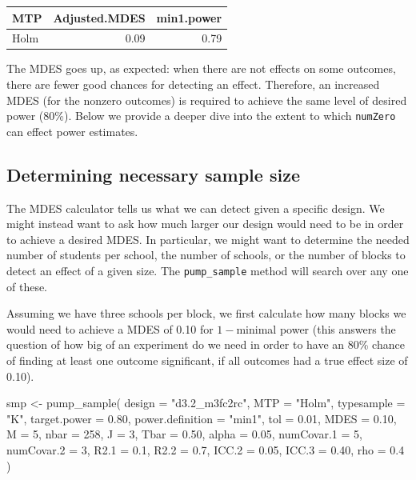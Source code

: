 \documentclass[
]{article}
\newenvironment{Shaded}{\begin{snugshade}}{\end{snugshade}}
\newcommand{\AttributeTok}[1]{\textcolor[rgb]{0.77,0.63,0.00}{#1}}
\newcommand{\DecValTok}[1]{\textcolor[rgb]{0.00,0.00,0.81}{#1}}
\newcommand{\FloatTok}[1]{\textcolor[rgb]{0.00,0.00,0.81}{#1}}
\newcommand{\FunctionTok}[1]{\textcolor[rgb]{0.00,0.00,0.00}{#1}}
\newcommand{\NormalTok}[1]{#1}
\newcommand{\OtherTok}[1]{\textcolor[rgb]{0.56,0.35,0.01}{#1}}
\newcommand{\StringTok}[1]{\textcolor[rgb]{0.31,0.60,0.02}{#1}}
\begin{document}
\begin{tabular}{l|r|r}
\hline
MTP & Adjusted.MDES & min1.power\\
\hline
Holm & 0.09 & 0.79\\
\hline
\end{tabular}

The MDES goes up, as expected: when there are not effects on some
outcomes, there are fewer good chances for detecting an effect.
Therefore, an increased MDES (for the nonzero outcomes) is required to
achieve the same level of desired power (80\%). Below we provide a
deeper dive into the extent to which \texttt{numZero} can effect power
estimates.

\subsection{Determining necessary sample size}

The MDES calculator tells us what we can detect given a specific design.
We might instead want to ask how much larger our design would need to be
in order to achieve a desired MDES. In particular, we might want to
determine the needed number of students per school, the number of
schools, or the number of blocks to detect an effect of a given size.
The \texttt{pump\_sample} method will search over any one of these.

Assuming we have three schools per block, we first calculate how many
blocks we would need to achieve a MDES of 0.10 for \(1-\)minimal power
(this answers the question of how big of an experiment do we need in
order to have an 80\% chance of finding at least one outcome
significant, if all outcomes had a true effect size of 0.10).

\begin{Shaded}
\begin{Highlighting}[]
\NormalTok{smp }\OtherTok{\textless{}{-}} \FunctionTok{pump\_sample}\NormalTok{(}
  \AttributeTok{design =} \StringTok{"d3.2\_m3fc2rc"}\NormalTok{,}
  \AttributeTok{MTP =} \StringTok{"Holm"}\NormalTok{,}
  \AttributeTok{typesample =} \StringTok{"K"}\NormalTok{,}
  \AttributeTok{target.power =} \FloatTok{0.80}\NormalTok{, }\AttributeTok{power.definition =} \StringTok{"min1"}\NormalTok{, }\AttributeTok{tol =} \FloatTok{0.01}\NormalTok{,}
  \AttributeTok{MDES =} \FloatTok{0.10}\NormalTok{, }\AttributeTok{M =} \DecValTok{5}\NormalTok{, }\AttributeTok{nbar =} \DecValTok{258}\NormalTok{, }\AttributeTok{J =} \DecValTok{3}\NormalTok{,}
  \AttributeTok{Tbar =} \FloatTok{0.50}\NormalTok{, }\AttributeTok{alpha =} \FloatTok{0.05}\NormalTok{, }\AttributeTok{numCovar.1 =} \DecValTok{5}\NormalTok{, }\AttributeTok{numCovar.2 =} \DecValTok{3}\NormalTok{,}
  \AttributeTok{R2.1 =} \FloatTok{0.1}\NormalTok{, }\AttributeTok{R2.2 =} \FloatTok{0.7}\NormalTok{, }\AttributeTok{ICC.2 =} \FloatTok{0.05}\NormalTok{, }\AttributeTok{ICC.3 =} \FloatTok{0.40}\NormalTok{, }\AttributeTok{rho =} \FloatTok{0.4}\NormalTok{ )}
\end{Highlighting}
\end{Shaded}
\end{document}
